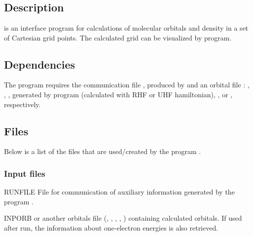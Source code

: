 
\section{}
\label{UG:sec:gridit}

\subsection{Description}
\label{UG:sec:gridit_description}
 is an interface program for calculations of molecular
orbitals and density in a set of Cartesian grid points. The calculated grid
can be visualized by  program.

\subsection{Dependencies}
\label{UG:sec:gridit_dependencies}
The  program requires the communication file ,
produced by  and an orbital file : ,
, , generated by program (calculated with RHF or UHF hamiltonian), ,
or , respectively.

\subsection{Files}
\label{UG:sec:gridit_files}

Below is a list of the files that are used/created by the program
.

\subsubsection{Input files}

\begin{filelist}
\item[RUNFILE]
File for communication of auxiliary information generated by the program
.
\item[INPORB]
 or another orbitals file (, ,
, , ) containing calculated orbitals.
If used after  run, the information about one-electron
energies is also retrieved.
\end{filelist}

